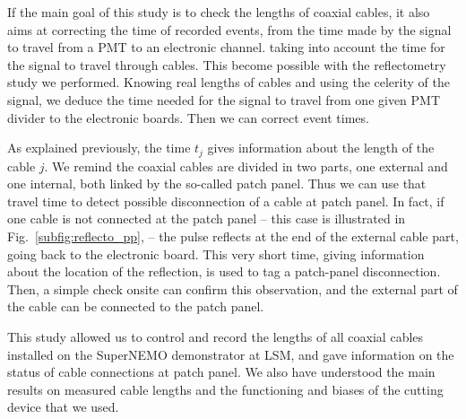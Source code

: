 If the main goal of this study is to check the lengths of coaxial cables, it also aims at correcting the time of recorded events, from the time made by the signal to travel from a PMT to an electronic channel.
taking into account the time for the signal to travel through cables.
This become possible with the reflectometry study we performed.
Knowing real lengths of cables and using the celerity of the signal, we deduce the time needed for the signal to travel from one given PMT divider to the electronic boards.
Then we can correct event times.

As explained previously, the time $t_{j}$ gives information about the length of the cable $j$.
We remind the coaxial cables are divided in two parts, one external and one internal, both linked by the so-called patch panel.
Thus we can use that travel time to detect possible disconnection of a cable at patch panel.
In fact, if one cable is not connected at the patch panel -- this case is illustrated in Fig.~\ref{subfig:reflecto_pp}, -- the pulse reflects at the end of the external cable part, going back to the electronic board.
This very short time, giving information about the location of the reflection, is used to tag a patch-panel disconnection.
Then, a simple check onsite can confirm this observation, and the external part of the cable can be connected to the patch panel.
\newline

This study allowed us to control and record the lengths of all coaxial cables installed on the SuperNEMO demonstrator at LSM, and gave information on the status of cable connections at patch panel.
We also have understood the main results on measured cable lengths and the functioning and biases of the cutting device that we used.

